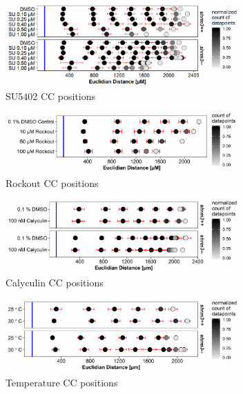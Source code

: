 \documentclass[11pt,singlespacinge,twoside]{reedthesis} %
\begin{document}
\begin{figure}

{\centering \includegraphics[width=0.8\textwidth]{figures/results/06_rescues/su54/cc_positions} 

}

\caption[SU5402 CC positions]{SU5402 CC positions}\label{fig:suppsucc}
\end{figure}

\begin{figure}

{\centering \includegraphics[width=0.8\textwidth]{figures/results/06_rescues/rockout/cc_positions} 

}

\caption[Rockout CC positions]{Rockout CC positions}\label{fig:supprkoutcc}
\end{figure}

\begin{figure}

{\centering \includegraphics[width=0.8\textwidth]{figures/results/06_rescues/caliculyn/cc_positions} 

}

\caption[Calyculin CC positions]{Calyculin CC positions}\label{fig:suppcalcc}
\end{figure}

\begin{figure}

{\centering \includegraphics[width=0.8\textwidth]{figures/results/06_rescues/temp/cc_positions} 

}

\caption[Temperature CC positions]{Temperature CC positions}\label{fig:supptempcc}
\end{figure}
\end{document}

